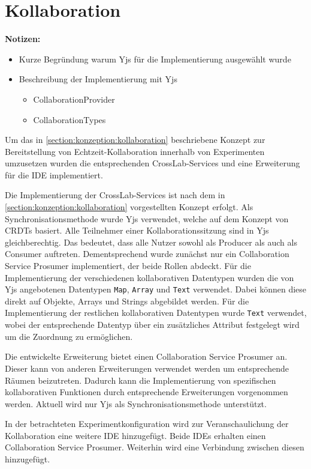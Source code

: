 \section{Kollaboration}\label{section:prototypische-implementierung:kollaboration}

\begin{note}
    \textbf{Notizen:}
    \begin{itemize}
        \item Kurze Begründung warum Yjs für die Implementierung ausgewählt wurde
        \item Beschreibung der Implementierung mit Yjs
              \begin{itemize}
                  \item CollaborationProvider
                  \item CollaborationTypes
              \end{itemize}
    \end{itemize}
\end{note}

Um das in \autoref{section:konzeption:kollaboration} beschriebene Konzept zur Bereitstellung von Echtzeit-Kollaboration innerhalb von Experimenten umzusetzen wurden die entsprechenden CrossLab-Services und eine Erweiterung für die IDE implementiert.

Die Implementierung der CrossLab-Services ist nach dem in \autoref{section:konzeption:kollaboration} vorgestellten Konzept erfolgt. Als Synchronisationsmethode wurde Yjs \cite{noauthor_yjs_nodate} verwendet, welche auf dem Konzept von \acp{CRDT} basiert. Alle Teilnehmer einer Kollaborationssitzung sind in Yjs gleichberechtig. Das bedeutet, dass alle Nutzer sowohl als Producer als auch als Consumer auftreten. Dementsprechend wurde zunächst nur ein Collaboration Service Prosumer implementiert, der beide Rollen abdeckt. Für die Implementierung der verschiedenen kollaborativen Datentypen wurden die von Yjs angebotenen Datentypen \texttt{Map}, \texttt{Array} und \texttt{Text} verwendet. Dabei können diese direkt auf Objekte, Arrays und Strings abgebildet werden. Für die Implementierung der restlichen kollaborativen Datentypen wurde \texttt{Text} verwendet, wobei der entsprechende Datentyp über ein zusätzliches Attribut festgelegt wird um die Zuordnung zu ermöglichen.

Die entwickelte Erweiterung bietet einen Collaboration Service Prosumer an. Dieser kann von anderen Erweiterungen verwendet werden um entsprechende Räumen beizutreten. Dadurch kann die Implementierung von spezifischen kollaborativen Funktionen durch entsprechende Erweiterungen vorgenommen werden. Aktuell wird nur Yjs als Synchronisationsmethode unterstützt.

In der betrachteten Experimentkonfiguration wird zur Veranschaulichung der Kollaboration eine weitere IDE hinzugefügt. Beide IDEs erhalten einen Collaboration Service Prosumer. Weiterhin wird eine Verbindung zwischen diesen hinzugefügt.